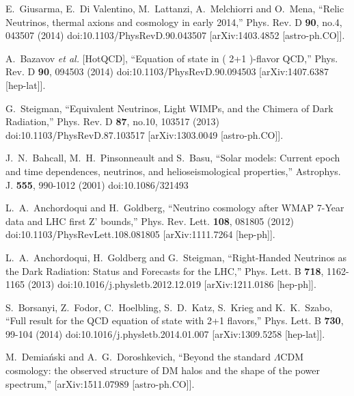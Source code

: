 \begin{thebibliography}{99}
E.~Giusarma, E.~Di Valentino, M.~Lattanzi, A.~Melchiorri and O.~Mena,
``Relic Neutrinos, thermal axions and cosmology in early 2014,''
Phys. Rev. D \textbf{90}, no.4, 043507 (2014)
doi:10.1103/PhysRevD.90.043507
[arXiv:1403.4852 [astro-ph.CO]].

A.~Bazavov \textit{et al.} [HotQCD],
``Equation of state in ( 2+1 )-flavor QCD,''
Phys. Rev. D \textbf{90}, 094503 (2014)
doi:10.1103/PhysRevD.90.094503
[arXiv:1407.6387 [hep-lat]].

G.~Steigman,
``Equivalent Neutrinos, Light WIMPs, and the Chimera of Dark Radiation,''
Phys. Rev. D \textbf{87}, no.10, 103517 (2013)
doi:10.1103/PhysRevD.87.103517
[arXiv:1303.0049 [astro-ph.CO]].

J.~N.~Bahcall, M.~H.~Pinsonneault and S.~Basu,
``Solar models: Current epoch and time dependences, neutrinos, and helioseismological properties,''
Astrophys. J. \textbf{555}, 990-1012 (2001)
doi:10.1086/321493

L.~A.~Anchordoqui and H.~Goldberg,
``Neutrino cosmology after WMAP 7-Year data and LHC first Z' bounds,''
Phys. Rev. Lett. \textbf{108}, 081805 (2012)
doi:10.1103/PhysRevLett.108.081805
[arXiv:1111.7264 [hep-ph]].

L.~A.~Anchordoqui, H.~Goldberg and G.~Steigman,
``Right-Handed Neutrinos as the Dark Radiation: Status and Forecasts for the LHC,''
Phys. Lett. B \textbf{718}, 1162-1165 (2013)
doi:10.1016/j.physletb.2012.12.019
[arXiv:1211.0186 [hep-ph]].

S.~Borsanyi, Z.~Fodor, C.~Hoelbling, S.~D.~Katz, S.~Krieg and K.~K.~Szabo,
``Full result for the QCD equation of state with 2+1 flavors,''
Phys. Lett. B \textbf{730}, 99-104 (2014)
doi:10.1016/j.physletb.2014.01.007
[arXiv:1309.5258 [hep-lat]].

M.~Demia\'nski and A.~G.~Doroshkevich,
``Beyond the standard $\Lambda$CDM cosmology: the observed structure of DM halos and the shape of the power spectrum,''
[arXiv:1511.07989 [astro-ph.CO]].


\end{thebibliography}
